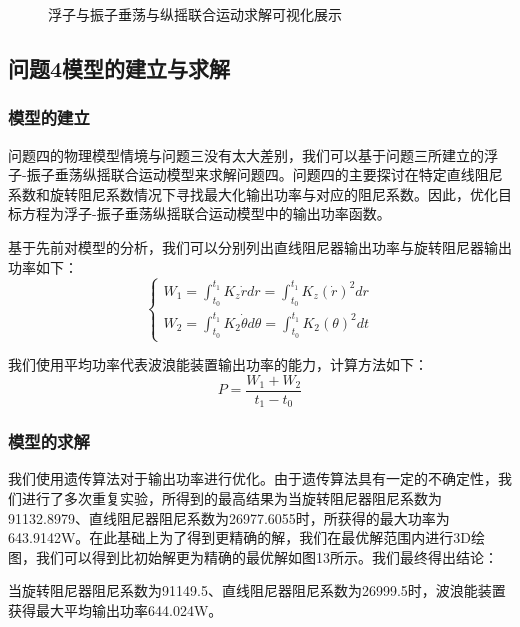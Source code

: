 \documentclass[12pt,utf8]{article}
\begin{document}
\begin{figure}[htbp]
\begin{minipage}{0.45\linewidth}
	\end{minipage}
	\caption{浮子与振子垂荡与纵摇联合运动求解可视化展示}
\end{figure}




\subsection{问题4模型的建立与求解}

\subsubsection{模型的建立}

问题四的物理模型情境与问题三没有太大差别，我们可以基于问题三所建立的浮子-振子垂荡纵摇联合运动模型来求解问题四。问题四的主要探讨在特定直线阻尼系数和旋转阻尼系数情况下寻找最大化输出功率与对应的阻尼系数。因此，优化目标方程为浮子-振子垂荡纵摇联合运动模型中的输出功率函数。

基于先前对模型的分析，我们可以分别列出直线阻尼器输出功率与旋转阻尼器输出功率如下：
\begin{equation}
	\begin{cases}
		W_1 = \int_{t_0}^{t_1}K_z\dot{r}dr = \int_{t_0}^{t_1}K_z(\dot{r})^2dr \\
		W_2 = \int_{t_0}^{t_1} K_2\dot{\theta}d\theta = \int_{t_0}^{t_1}K_2(\theta)^2dt
	\end{cases}
\end{equation}

我们使用平均功率代表波浪能装置输出功率的能力，计算方法如下：
\begin{equation}
	P = \frac{W_1+W_2}{t_1-t_0}
\end{equation}

\subsubsection{模型的求解}

我们使用遗传算法对于输出功率进行优化。由于遗传算法具有一定的不确定性，我们进行了多次重复实验，所得到的最高结果为当旋转阻尼器阻尼系数为91132.8979、直线阻尼器阻尼系数为26977.6055时，所获得的最大功率为643.9142W。在此基础上为了得到更精确的解，我们在最优解范围内进行3D绘图，我们可以得到比初始解更为精确的最优解如图13所示。我们最终得出结论：

当旋转阻尼器阻尼系数为91149.5、直线阻尼器阻尼系数为26999.5时，波浪能装置获得最大平均输出功率644.024W。
\end{document}
